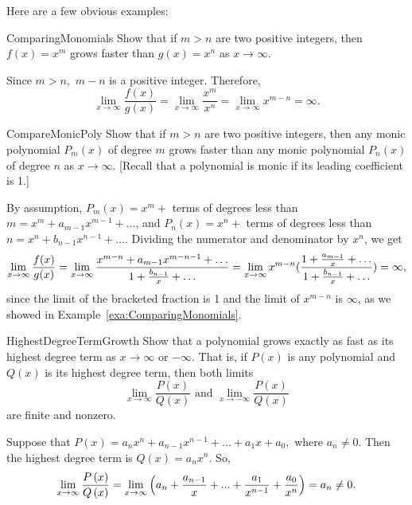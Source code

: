 Here are a few obvious examples:

\begin{example}{}{ComparingMonomials}
Show that if $m>n$ are two positive integers, then $f(x)=x^m$ grows faster
than $g(x)=x^n$ as $x\to \infty$.
\end{example}
\begin{solution}
Since $m>n,$ $m-n$ is a positive integer. Therefore,%
\begin{equation*}
\lim_{x\to \infty}\frac{f(x)}{g(x)}=\lim_{x\to \infty}\frac{x^m}{x^n}=\lim_{x\to \infty}x^{m-n}=\infty.
\end{equation*}
\end{solution}

\begin{example}{}{CompareMonicPoly}
Show that if $m>n$ are two positive integers, then any monic polynomial
$P_{m}(x)$ of degree $m$ grows faster than any monic polynomial
$P_{n}(x)$ of degree $n$ as $x\to \infty$. [Recall that
a polynomial is monic if its leading coefficient is 1.]
\end{example}
\begin{solution}
By assumption, $P_{m}(x)=x^m+$ terms of degrees less than 
$m=x^{m}+a_{m-1}x^{m-1}+\ldots$, and $P_{n}(x)=x^n+$ terms of
degrees less than $n=x^{n}+b_{n-1}x^{n-1}+\ldots$. Dividing the numerator and
denominator by $x^n$, we get%
\begin{equation*}
\lim_{x\to \infty}\frac{f(x)}{g(x)}=\lim_{x\to \infty}\frac{x^{m-n}+a_{m-1}x^{m-n-1}+\ldots}{1+\frac{%
		b_{n-1}}{x}+\ldots}=\lim_{x\to \infty}x^{m-n}(\frac{1+\frac{%
		a_{m-1}}{x}+\ldots}{1+\frac{b_{n-1}}{x}+\ldots}) =\infty,
\end{equation*}%
since the limit of the bracketed fraction is 1 and the limit of $x^{m-n}$ is 
$\infty$, as we showed in Example~\ref{exa:ComparingMonomials}.
\end{solution}

\begin{example}{}{HighestDegreeTermGrowth}
Show that a polynomial grows exactly as fast as its highest degree term
as $x\to \infty$ or $-\infty$. That is, if $P(x)$ is
any polynomial and $Q(x)$ is its highest degree term, then both limits
\begin{equation*}
\lim_{x\to \infty}\frac{P(x)}{Q(x)}\text{ and }\lim_{x\to -\infty}\frac{P(x)}{Q(x)}
\end{equation*}%
are finite and nonzero.
\end{example}
\begin{solution}
Suppose that $P(x)=a_{n}x^{n}+a_{n-1}x^{n-1}+\ldots+a_{1}x+a_{0},$ where $a_{n}\neq 0.$ Then the
highest degree term is $Q\left( x\right) =a_{n}x^{n}.$ So,%
\begin{equation*}
\lim_{x\to \infty }\frac{P\left( x\right) }{Q\left( x\right) }%
=\lim_{x\to \infty }\left( a_{n}+\frac{a_{n-1}}{x}+...+\frac{a_{1}}{%
	x^{n-1}}+\frac{a_{0}}{x^{n}}\right) =a_{n}\neq 0.
\end{equation*}
\end{solution}

